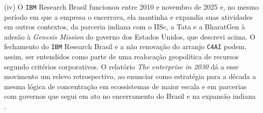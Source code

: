 (iv) O \texttt{IBM} Research Brasil funcionou entre 2010 e novembro de 2025 e, no mesmo período em que a empresa o encerrava, ela mantinha e expandia suas atividades em outros contextos, da parceria indiana com o IISc, a Tata e a BharatGen à adesão à \textit{Genesis Mission} do governo dos Estados Unidos, que descrevi acima. O fechamento do \texttt{IBM} Research Brasil e a não renovação do arranjo \texttt{C4AI} podem, assim, ser entendidos como parte de uma realocação geopolítica de recursos segundo critérios corporativos. O relatório \textit{The enterprise in 2030} dá a esse movimento um relevo retrospectivo, ao enunciar como estratégia para a década a mesma lógica de concentração em ecossistemas de maior escala e em parcerias com governos que segui em ato no encerramento do Brasil e na expansão indiana \parencite{IBMEnterprise2030}.

